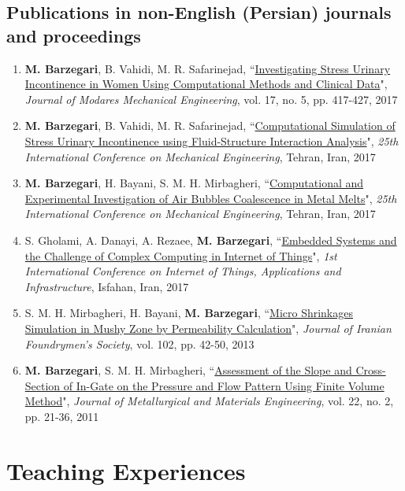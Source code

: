 \documentclass{cv}
\begin{document}
\subsection{Publications in non-English (Persian) journals and proceedings}
\begin{enumerate}
\item
\textbf{M. Barzegari}, B. Vahidi, M. R. Safarinejad, ``\href{http://mme-old.modares.ac.ir/article_16771_en.html}{Investigating Stress Urinary Incontinence in Women Using Computational Methods and Clinical Data}", \textit{Journal of Modares Mechanical Engineering}, vol. 17, no. 5, pp. 417-427, 2017 %
\item
\textbf{M. Barzegari}, B. Vahidi, M. R. Safarinejad, ``\href{https://www.civilica.com/Paper-ISME25-ISME25_342.html}{Computational Simulation of Stress Urinary Incontinence using Fluid-Structure Interaction Analysis}", \textit{25th International Conference on Mechanical Engineering}, Tehran, Iran, 2017
\item
\textbf{M. Barzegari}, H. Bayani, S. M. H. Mirbagheri, ``\href{https://www.civilica.com/Paper-ISME25-ISME25_710.html}{Computational and Experimental Investigation of Air Bubbles Coalescence in Metal Melts}", \textit{25th International Conference on Mechanical Engineering}, Tehran, Iran, 2017
\item
S. Gholami, A. Danayi, A. Rezaee, \textbf{M. Barzegari}, ``\href{https://www.civilica.com/Paper-IOTCONF01-IOTCONF01_014.html}{Embedded Systems and the Challenge of Complex Computing in Internet of Things}", \textit{1st International Conference on Internet of Things, Applications and Infrastructure}, Isfahan, Iran, 2017
\item
S. M. H. Mirbagheri, H. Bayani, \textbf{M. Barzegari}, ``\href{https://1drv.ms/b/s!Av7P45pSaDtYgUnsN3LHLbiNHomt}{Micro Shrinkages Simulation in Mushy Zone by Permeability Calculation}", \textit{Journal of Iranian Foundrymen's Society}, vol. 102, pp. 42-50, 2013 %
\item
\textbf{M. Barzegari}, S. M. H. Mirbagheri, ``\href{http://jmme.um.ac.ir/index.php/metallurgical/article/view/10905}{Assessment of the Slope and Cross-Section of In-Gate on the Pressure and Flow Pattern Using Finite Volume Method}", \textit{Journal of Metallurgical and Materials Engineering}, vol. 22, no. 2, pp. 21-36, 2011 %
\end{enumerate}



\section{Teaching Experiences}
\end{document}
